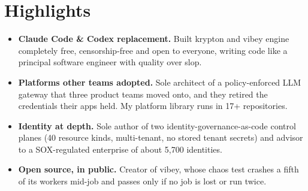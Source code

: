 \documentclass[10pt,letterpaper]{article}
\begin{document}
\section*{Highlights}
\begin{itemize}
\item \textbf{Claude Code \& Codex replacement.} Built krypton and vibey engine completely free, censorship-free and open to everyone, writing code like a principal software engineer with quality over slop.
\item \textbf{Platforms other teams adopted.} Sole architect of a policy-enforced LLM gateway that three product teams moved onto, and they retired the credentials their apps held. My platform library runs in 17+ repositories.
\item \textbf{Identity at depth.} Sole author of two identity-governance-as-code control planes (40 resource kinds, multi-tenant, no stored tenant secrets) and advisor to a SOX-regulated enterprise of about 5,700 identities.
\item \textbf{Open source, in public.} Creator of vibey, whose chaos test crashes a fifth of its workers mid-job and passes only if no job is lost or run twice.
\end{itemize}
\end{document}
